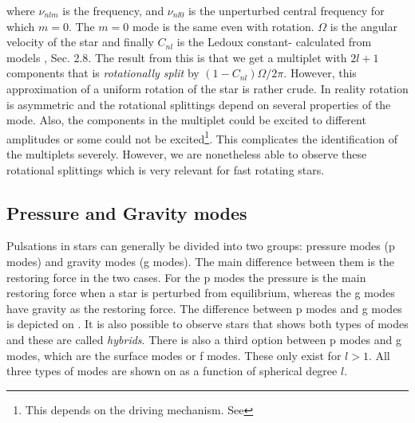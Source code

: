 \noindent where $\nu_{nlm}$ is the frequency, and $\nu_{nl0}$ is the unperturbed central frequency for which $m=0$. The $m=0$ mode is the same even with rotation. $\Omega$ is the angular velocity of the star and finally $C_{nl}$ is the Ledoux constant- calculated from models \citep{aerts2010}, Sec. 2.8. The result from this is that we get a multiplet with $2l+1$ components that is \textit{rotationally split} by $(1-C_{nl})\Omega/2\pi$. However, this approximation of a uniform rotation of the star is rather crude. In reality rotation is asymmetric and the rotational splittings depend on several properties of the mode. Also, the components in the multiplet could be excited to different amplitudes or some could not be excited\footnote{This depends on the driving mechanism. See }. This complicates the identification of the multiplets severely. However, we are nonetheless able to observe these rotational splittings which is very relevant for fast rotating stars. 

\subsection{Pressure and Gravity modes}
\label{pandgsec}
Pulsations in stars can generally be divided into two groups: pressure modes (p modes) and gravity modes (g modes). The main difference between them is the restoring force in the two cases. For the p modes the pressure is the main restoring force when a star is perturbed from equilibrium, whereas the g modes have gravity as the restoring force. The difference between p modes and g modes is depicted on . It is also possible to observe stars that shows both types of modes and these are called \textit{hybrids}. There is also a third option between p modes and g modes, which are the surface modes or f modes. These only exist for $l>1$. All three types of modes are shown on  as a function of spherical degree $l$. 

